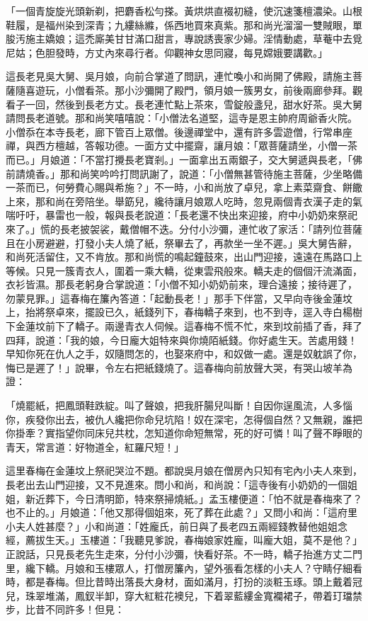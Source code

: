 「一個青旋旋光頭新剃，把麝香松勻搽。黃烘烘直裰初縫，使沉速箋檀濃染。山根鞋履，是福州染到深青；九縷絲縧，係西地買來真紫。那和尚光溜溜一雙賊眼，單朘汚施主嬌娘；這禿廝美甘甘滿口甜言，專說誘喪家少婦。淫情動處，草菴中去覓尼姑；色胆發時，方丈內來尋行者。仰觀神女思同寢，每見嫦娥要講歡。」

這長老見吳大舅、吳月娘，向前合掌道了問訊，連忙喚小和尚開了佛殿，請施主菩薩隨喜遊玩，小僧看茶。那小沙彌開了殿門，領月娘一簇男女，前後兩廊參拜。觀看子一回，然後到長老方丈。長老連忙點上茶來，雪錠般盞兒，甜水好茶。吳大舅請問長老道號。那和尚笑嘻嘻說：「小僧法名道堅，這寺是恩主帥府周爺香火院。小僧忝在本寺長老，廊下管百上眾僧。後邊禪堂中，還有許多雲遊僧，行常串座禪，與西方檀越，答報功德。一面方丈中擺齋，讓月娘：「眾菩薩請坐，小僧一茶而已。」月娘道：「不當打攪長老寶剎。」一面拿出五兩銀子，交大舅遞與長老，「佛前請燒香。」那和尚笑吟吟打問訊謝了，說道：「小僧無甚管待施主菩薩，少坐略備一茶而已，何勞費心賜與希施？」不一時，小和尚放了卓兒，拿上素菜齋食、餅饊上來，那和尚在旁陪坐。舉筯兒，纔待讓月娘眾人吃時，忽見兩個青衣漢子走的氣喘吁吁，暴雷也一般，報與長老說道：「長老還不快出來迎接，府中小奶奶來祭祀來了。」慌的長老披袈裟，戴僧帽不迭。分付小沙彌，連忙收了家活：「請列位菩薩且在小房避避，打發小夫人燒了紙，祭畢去了，再款坐一坐不遲。」吳大舅告辭，和尚死活留住，又不肯放。那和尚慌的鳴起鐘鼓來，出山門迎接，遠遠在馬路口上等候。只見一簇青衣人，圍着一乘大轎，從東雲飛般來。轎夫走的個個汗流滿面，衣衫皆濕。那長老躬身合掌說道：「小僧不知小奶奶前來，理合遠接；接待遲了，勿蒙見罪。」這春梅在簾內答道：「起動長老！」那手下伴當，又早向寺後金蓮坟上，抬將祭卓來，擺設已久，紙錢列下，春梅轎子來到，也不到寺，逕入寺白楊樹下金蓮坟前下了轎子。兩邊青衣人伺候。這春梅不慌不忙，來到坟前插了香，拜了四拜，說道：「我的娘，今日龐大姐特來與你燒陌紙錢。你好處生天。苦處用錢！早知你死在仇人之手，奴隨問怎的，也娶來府中，和奴做一處。還是奴躭誤了你，悔已是遲了！」說畢，令左右把紙錢燒了。這春梅向前放聲大哭，有哭山坡羊為證：

「燒罷紙，把鳳頭鞋跌綻。叫了聲娘，把我肝腸兒叫斷！自因你逞風流，人多惱你，疾發你出去，被仇人纔把你命兒坑陷！奴在深宅，怎得個自然？又無親，誰把你掛牽？實指望你同床兒共枕，怎知道你命短無常，死的好可憐！叫了聲不睜眼的青天，常言道：好物道全，紅羅尺短！」

這里春梅在金蓮坟上祭祀哭泣不題。都說吳月娘在僧房內只知有宅內小夫人來到，長老出去山門迎接，又不見進來。問小和尚，和尚說：「這寺後有小奶奶的一個姐姐，新近葬下，今日清明節，特來祭掃燒紙。」孟玉樓便道：「怕不就是春梅來了？也不止的。」月娘道：「他又那得個姐來，死了葬在此處？」又問小和尚：「這府里小夫人姓甚麼？」小和尚道：「姓龐氏，前日與了長老四五兩經錢教替他姐姐念經，薦拔生天。」玉樓道：「我聽見爹說，春梅娘家姓龐，叫龐大姐，莫不是他？」正說話，只見長老先生走來，分付小沙彌，快看好茶。不一時，轎子抬進方丈二門里，纔下轎。月娘和玉樓眾人，打僧房簾內，望外張看怎樣的小夫人？守睛仔細看時，都是春梅。但比昔時出落長大身材，面如滿月，打扮的淡粧玉琢。頭上戴着冠兒，珠翠堆滿，鳳釵半卸，穿大紅粧花襖兒，下着翠藍縷金寬襴裙子，帶着玎璫禁步，比昔不同許多！但見：

